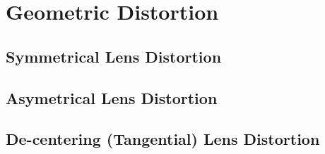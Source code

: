 \section{Geometric Distortion}

\subsection{Symmetrical Lens Distortion}
\subsection{Asymetrical Lens Distortion}
\subsection{De-centering (Tangential) Lens Distortion}

